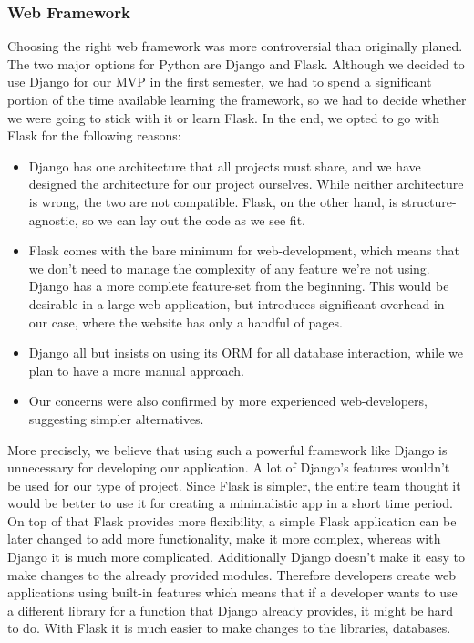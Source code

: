 \documentclass[main.tex]{subfiles}
\begin{document}
\subsubsection{Web Framework}
\label{Web Framework}
Choosing the right web framework was more controversial than originally planed. The two major options for Python are Django and Flask. Although we decided to use Django for our MVP in the first semester, we had to spend a significant portion of the time available learning the framework, so we had to decide whether we were going to stick with it or learn Flask. In the end, we opted to go with Flask for the following reasons:

\begin{itemize}
    \item Django has one architecture that all projects must share, and we have designed the architecture for our project ourselves. While neither architecture is wrong, the two are not compatible. Flask, on the other hand, is structure-agnostic, so we can lay out the code as we see fit.

    \item Flask comes with the bare minimum for web-development, which means that we don't need to manage the complexity of any feature we're not using. Django has a more complete feature-set from the beginning. This would be desirable in a large web application, but introduces significant overhead in our case, where the website has only a handful of pages.

    \item Django all but insists on using its ORM for all database interaction, while we plan to have a more manual approach.

    \item Our concerns were also confirmed by more experienced web-developers, suggesting simpler alternatives.
\end{itemize}

More precisely, we believe that using such a powerful framework like Django is unnecessary for developing our application. A lot of Django's features wouldn't be used for our type of project. Since Flask is simpler, the entire team thought it would be better to use it for creating a minimalistic app in a short time period. On top of that Flask provides more flexibility, a simple Flask application can be later changed to add more functionality, make it more complex, whereas with Django it is much more complicated. Additionally Django doesn't make it easy to make changes to the already provided modules. Therefore developers create web applications using built-in features which means that if a developer wants to use a different library for a function that Django already provides, it might be hard to do. With Flask it is much easier to make changes to the libraries, databases. 
\end{document}
